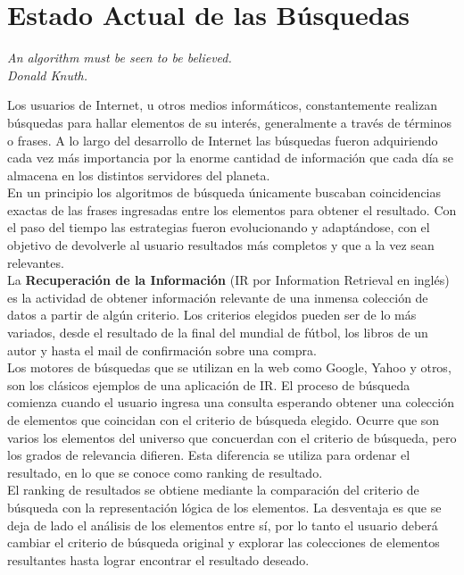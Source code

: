 \section{Estado Actual de las Búsquedas}
{\begin{small}%
\begin{flushright}%
\it An algorithm must be seen to be believed.\\Donald Knuth.
\end{flushright}%
\end{small}%
\vspace{.5cm}}
Los usuarios de Internet, u otros medios informáticos, constantemente realizan búsquedas para hallar elementos de su interés, generalmente a través de términos o frases. A lo largo del desarrollo de Internet las búsquedas fueron adquiriendo cada vez más importancia por la enorme cantidad de información que cada día se almacena en los distintos servidores del planeta.\\
En un principio los algoritmos de búsqueda únicamente buscaban coincidencias exactas de las frases ingresadas entre los elementos para obtener el resultado. Con el paso del tiempo las estrategias fueron evolucionando y adaptándose, con el objetivo de devolverle al usuario resultados más completos y que a la vez sean relevantes.\\
La \textbf{Recuperación de la Información} (IR por Information Retrieval en inglés) es la actividad de obtener información relevante de una inmensa colección de datos a partir de algún criterio. Los criterios elegidos pueden ser de lo más variados, desde el resultado de la final del mundial de fútbol, los libros de un autor y hasta el mail de confirmación sobre una compra.\\
Los motores de búsquedas que se utilizan en la web como Google, Yahoo y otros, son los clásicos ejemplos de una aplicación de IR. El proceso de búsqueda comienza cuando el usuario ingresa una consulta esperando obtener una colección de elementos que coincidan con el criterio de búsqueda elegido. Ocurre que son varios los elementos del universo que concuerdan con el criterio de búsqueda, pero los grados de relevancia difieren. Esta diferencia se utiliza para ordenar el resultado, en lo que se conoce como ranking de resultado.\\
El ranking de resultados se obtiene mediante la comparación del criterio de búsqueda con la representación lógica de los elementos. La desventaja es que se deja de lado el análisis de los elementos entre sí, por lo tanto el usuario deberá cambiar el criterio de búsqueda original y explorar las colecciones de elementos resultantes hasta lograr encontrar el resultado deseado.\\
